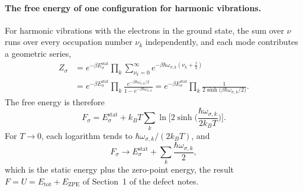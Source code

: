 \documentclass[11pt]{article}      %
\numberwithin{equation}{section}   %
\begin{document}
\paragraph{The free energy of one configuration for harmonic vibrations.}
For harmonic vibrations with the electrons in the ground state, the sum
over $\nu$ runs over every occupation number $\nu_k$ independently, and each
mode contributes a geometric series,
\begin{align*}
    Z_\sigma
    &=e^{-\beta E^{\text{stat}}_\sigma}\prod_k\sum_{\nu_k=0}^{\infty}
    e^{-\beta\hbar\omega_{\sigma,k}\left(\nu_k+\frac12\right)}\\
    &=e^{-\beta E^{\text{stat}}_\sigma}\prod_k
    \frac{e^{-\beta\hbar\omega_{\sigma,k}/2}}{1-e^{-\beta\hbar\omega_{\sigma,k}}}
    =e^{-\beta E^{\text{stat}}_\sigma}\prod_k
    \frac{1}{2\sinh\!\big(\beta\hbar\omega_{\sigma,k}/2\big)}.
\end{align*}
The free energy is therefore
\begin{equation}
    \boxed{F_\sigma=E^{\text{stat}}_\sigma
    +k_BT\sum_k\ln\!\Big[2\sinh\!\Big(\frac{\hbar\omega_{\sigma,k}}{2k_BT}\Big)\Big].}
    \label{eq:harmonic}
\end{equation}
For $T\to0$, each logarithm tends to $\hbar\omega_{\sigma,k}/(2k_BT)$, and
\begin{equation*}
    F_\sigma\to E^{\text{stat}}_\sigma+\sum_k\frac{\hbar\omega_{\sigma,k}}{2},
\end{equation*}
which is the static energy plus the zero-point energy, the result
$F=U=E_{\text{tot}}+E_{\text{ZPE}}$ of Section~1 of the defect notes.
\end{document}

